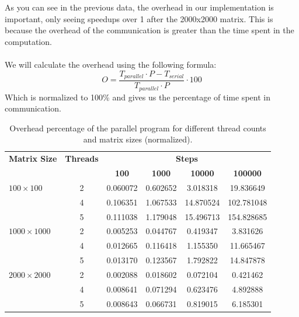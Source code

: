 \documentclass[12pt]{article}
\begin{document}
As you can see in the previous data, the overhead in our implementation is important, only seeing speedups over 1 after the 2000x2000 matrix. This is because the overhead of the communication is greater than the time spent in the computation.\\\\
We will calculate the overhead using the following formula:
\begin{equation}
	O = \frac{T_{parallel} \cdot P - T_{serial}}{T_{parallel} \cdot P} \cdot 100
\end{equation}
Which is normalized to 100\% and gives us the percentage of time spent in communication.
\newpage
\begin{table}[h!]
	\centering
	\begin{tabular}{lccccc}
		\hline
		\textbf{Matrix Size} & \textbf{Threads} & \multicolumn{4}{c}{\textbf{Steps}}                                                    \\
		\cline{3-6}
		                     &                  & \textbf{100}                       & \textbf{1000} & \textbf{10000} & \textbf{100000} \\
		\hline
		$100\times 100$      & 2                & 0.060072                           & 0.602652      & 3.018318       & 19.836649       \\
		                     & 4                & 0.106351                           & 1.067533      & 14.870524      & 102.781048      \\
		                     & 5                & 0.111038                           & 1.179048      & 15.496713      & 154.828685      \\
		$1000\times 1000$    & 2                & 0.005253                           & 0.044767      & 0.419347       & 3.831626        \\
		                     & 4                & 0.012665                           & 0.116418      & 1.155350       & 11.665467       \\
		                     & 5                & 0.013170                           & 0.123567      & 1.792822       & 14.847878       \\
		$2000\times 2000$    & 2                & 0.002088                           & 0.018602      & 0.072104       & 0.421462        \\
		                     & 4                & 0.008641                           & 0.071294      & 0.623476       & 4.892888        \\
		                     & 5                & 0.008643                           & 0.066731      & 0.819015       & 6.185301        \\
		\hline
	\end{tabular}
	\caption{Overhead percentage of the parallel program for different thread counts and matrix sizes (normalized).}
	\label{tab:overhead}
\end{table}
\end{document}
